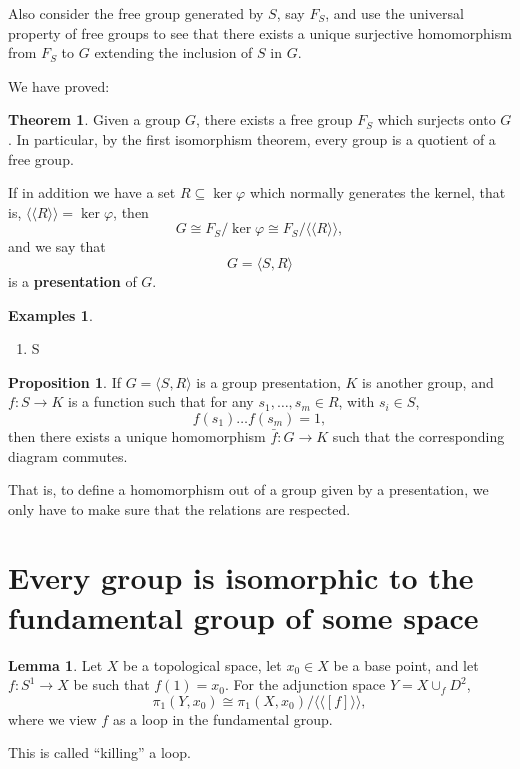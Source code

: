 \documentclass{book}
\theoremstyle{definition}
\newtheorem*{lema}{Lemma}
\newtheorem*{teo}{Theorem}
\newtheorem*{prop}{Proposition}
\newtheorem*{ejems}{Examples}
\begin{document}
Also consider the free group generated by $S$, say $F_S$,
and use the universal property of free groups to see that
there exists a unique surjective homomorphism from $F_S$ to
$G$ extending the inclusion of $S$ in $G$.

We have proved:

\begin{teo}
Given a group $G$, there exists a free group $F_S$ which
surjects onto $G$. In particular, by the first isomorphism
theorem, every group is a quotient of a free group.
\end{teo}

If in addition we have a set $R\subseteq\ker\varphi$ which
normally generates the kernel, that is,
$\langle\langle R\rangle\rangle=\ker\varphi$, then
$$
G\cong F_S/\ker\varphi
\cong F_S/\langle\langle R\rangle\rangle,
$$
and we say that
$$
G=\langle S,R\rangle
$$
is a \textbf{presentation} of $G$.

\begin{ejems}
\begin{enumerate}
\item S
\end{enumerate}
\end{ejems}

\begin{prop}
If $G=\langle S,R\rangle$ is a group presentation, $K$ is
another group, and $f:S\to K$ is a function such that for
any $s_1,\ldots,s_m\in R$, with $s_i\in S$,
$$
f(s_1)\ldots f(s_m)=1,
$$
then there exists a unique homomorphism $\bar f:G\to K$
such that the corresponding diagram commutes.
\end{prop}

That is, to define a homomorphism out of a group given by a
presentation, we only have to make sure that the relations
are respected.

\section{Every group is isomorphic to the fundamental group
of some space}

\begin{lema}
Let $X$ be a topological space, let $x_0\in X$ be a base
point, and let $f:S^1\to X$ be such that $f(1)=x_0$. For the
adjunction space $Y=X\cup_f D^2$,
$$
\pi_1(Y,x_0)\cong
\pi_1(X,x_0)\big/\langle\langle [f]\rangle\rangle,
$$
where we view $f$ as a loop in the fundamental group.
\end{lema}

This is called ``killing'' a loop.
\end{document}
